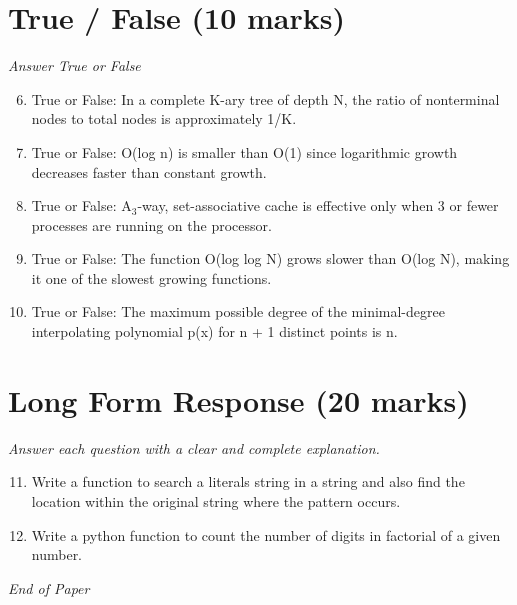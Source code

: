 \documentclass[12pt]{article}
\begin{document}
\section*{True / False (10 marks)}
\textit{Answer True or False}
\begin{enumerate}[label=\arabic*.]
\setcounter{enumi}{5}
\item True or False: In a complete K-ary tree of depth N, the ratio of nonterminal nodes to total nodes is approximately 1/K.
\item True or False: O(log n) is smaller than O(1) since logarithmic growth decreases faster than constant growth.
\item True or False: A$_{3}$-way, set-associative cache is effective only when 3 or fewer processes are running on the processor.
\item True or False: The function O(log log N) grows slower than O(log N), making it one of the slowest growing functions.
\item True or False: The maximum possible degree of the minimal-degree interpolating polynomial p(x) for n + 1 distinct points is n.
\end{enumerate}

\section*{Long Form Response (20 marks)}
\textit{Answer each question with a clear and complete explanation.}
\begin{enumerate}[label=\arabic*.]
\setcounter{enumi}{10}
\item Write a function to search a literals string in a string and also find the location within the original string where the pattern occurs.
\item Write a python function to count the number of digits in factorial of a given number.
\end{enumerate}

\vfill
\noindent\textit{End of Paper}
\end{document}
